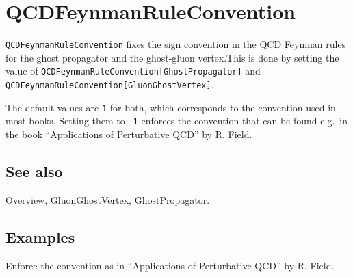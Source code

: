 \documentclass[../FeynCalcManual.tex]{subfiles}
\begin{document}
\hypertarget{qcdfeynmanruleconvention}{%
\section{QCDFeynmanRuleConvention}\label{qcdfeynmanruleconvention}}

\texttt{QCDFeynmanRuleConvention} fixes the sign convention in the QCD
Feynman rules for the ghost propagator and the ghost-gluon vertex.This
is done by setting the value of
\texttt{QCDFeynmanRuleConvention[\allowbreak{}GhostPropagator]} and
\texttt{QCDFeynmanRuleConvention[\allowbreak{}GluonGhostVertex]}.

The default values are \texttt{1} for both, which corresponds to the
convention used in most books. Setting them to \texttt{-1} enforces the
convention that can be found e.g.~in the book ``Applications of
Perturbative QCD'' by R. Field.

\subsection{See also}

\hyperlink{toc}{Overview},
\hyperlink{gluonghostvertex}{GluonGhostVertex},
\hyperlink{ghostpropagator}{GhostPropagator}.

\subsection{Examples}

Enforce the convention as in ``Applications of Perturbative QCD'' by R.
Field.

\begin{Shaded}
\begin{Highlighting}[]
\OperatorTok{[}\OperatorTok{]} \ExtensionTok{=} \SpecialCharTok{{-}}\NormalTok{; }
 
\OperatorTok{[}\OperatorTok{]} \ExtensionTok{=} \SpecialCharTok{{-}}\NormalTok{;}
\end{Highlighting}
\end{Shaded}

\begin{Shaded}
\begin{Highlighting}[]
\OperatorTok{[}\OperatorTok{,} \OperatorTok{,} \OperatorTok{]} \SpecialCharTok{//}
\end{Highlighting}
\end{Shaded}
\end{document}
